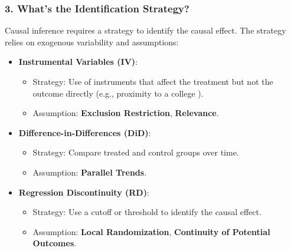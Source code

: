 \documentclass[xcolor=svgnames,t]{beamer}
\begin{document}
\begin{frame}
    \frametitle{3. What's the Identification Strategy?}

    Causal inference requires a strategy to identify the causal effect. The strategy relies on exogenous variability and assumptions:
    
    \begin{itemize}
        \pause
        \item \textbf{Instrumental Variables (IV)}: 
        \begin{itemize}
            \item Strategy: Use of instruments that affect the treatment but not the outcome directly (e.g., proximity to a college \cite{angrist1991education}).
            \item Assumption: \textbf{Exclusion Restriction}, \textbf{Relevance}.
        \end{itemize}

        \pause
        \item \textbf{Difference-in-Differences (DiD)}: 
        \begin{itemize}
            \item Strategy: Compare treated and control groups over time.
            \item Assumption: \textbf{Parallel Trends}.
        \end{itemize}

        \pause
        \item \textbf{Regression Discontinuity (RD)}: 
        \begin{itemize}
            \item Strategy: Use a cutoff or threshold to identify the causal effect.
            \item Assumption: \textbf{Local Randomization}, \textbf{Continuity of Potential Outcomes}.
        \end{itemize}
    \end{itemize}
\end{frame}
\end{document}
